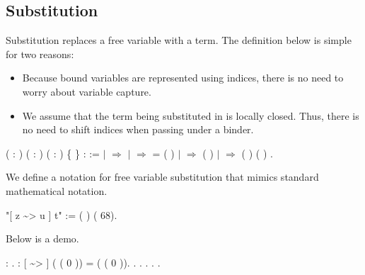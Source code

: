 \documentclass[12pt]{report}
\begin{document}
\subsection{Substitution}



 Substitution replaces a free variable with a term.  The definition
    below is simple for two reasons:

\begin{itemize}
\item  Because bound variables are represented using indices, there
        is no need to worry about variable capture.

\item  We assume that the term being substituted in is locally
        closed.  Thus, there is no need to shift indices when
        passing under a binder.

\end{itemize}

\begin{coqdoccode}
\coqdocemptyline
\coqdocnoindent
{}  ( : ) ( : ) ( : ) \{ \} :  :=\coqdoceol
\coqdocindent{1.00em}
  \coqdoceol
\coqdocindent{1.00em}
\ensuremath{|}      \ensuremath{\Rightarrow}  \coqdoceol
\coqdocindent{1.00em}
\ensuremath{|}      \ensuremath{\Rightarrow}   =     ( )\coqdoceol
\coqdocindent{1.00em}
\ensuremath{|}      \ensuremath{\Rightarrow}  (   )\coqdoceol
\coqdocindent{1.00em}
\ensuremath{|}    \ensuremath{\Rightarrow}  (   ) (   )\coqdoceol
\coqdocindent{1.00em}
.\coqdoceol
\coqdocemptyline
\end{coqdoccode}
We define a notation for free variable substitution that mimics
    standard mathematical notation. 
\begin{coqdoccode}
\coqdocemptyline
\coqdocnoindent
{} "[ z \~{}> u ] t" := (   ) (  68).\coqdoceol
\coqdocemptyline
\end{coqdoccode}
Below is a demo. 
\begin{coqdoccode}
\coqdocemptyline
\coqdocnoindent
{}  : .\coqdoceol
\coqdocnoindent
{} :  [ \~{}> ] ( ( 0 )) = ( ( 0 )).\coqdoceol
\coqdocnoindent
{}. . . . .\coqdoceol
\coqdocemptyline
\end{coqdoccode}
\end{document}
